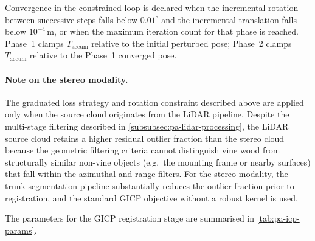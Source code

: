 Convergence in the constrained loop is declared when the incremental rotation between successive steps falls below $0.01^{\circ}$ and the incremental translation falls below $10^{-4}$\,m, or when the maximum iteration count for that phase is reached. Phase~1 clamps $T_{\text{accum}}$ relative to the initial perturbed pose; Phase~2 clamps $T_{\text{accum}}$ relative to the Phase~1 converged pose.

\paragraph{Note on the stereo modality.}
The graduated loss strategy and rotation constraint described above are applied only when the source cloud originates from the LiDAR pipeline. Despite the multi-stage filtering described in \cref{subsubsec:pa-lidar-processing}, the LiDAR source cloud retains a higher residual outlier fraction than the stereo cloud because the geometric filtering criteria cannot distinguish vine wood from structurally similar non-vine objects (e.g.\ the mounting frame or nearby surfaces) that fall within the azimuthal and range filters. For the stereo modality, the trunk segmentation pipeline substantially reduces the outlier fraction prior to registration, and the standard GICP objective without a robust kernel is used.

The parameters for the GICP registration stage are summarised in \cref{tab:pa-icp-params}.

